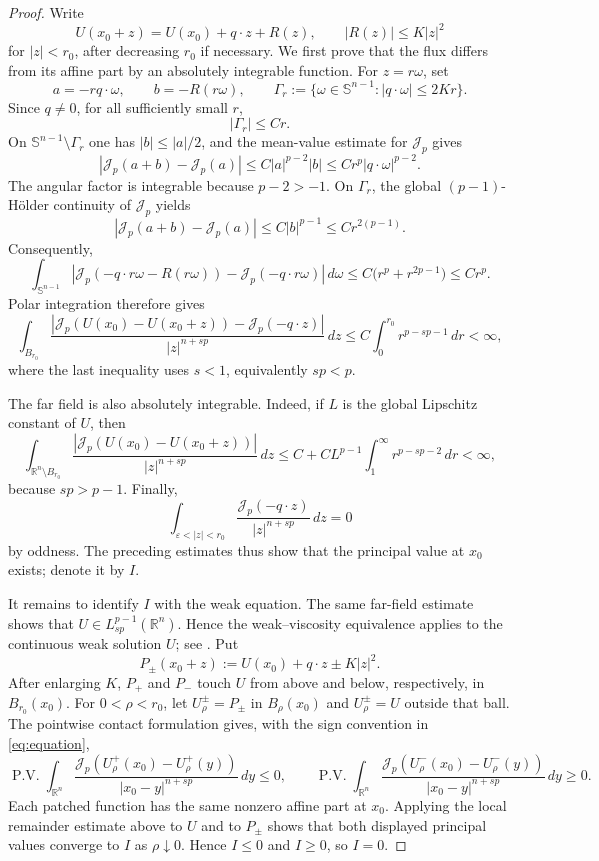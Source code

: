 \documentclass[11pt,reqno]{amsart}
\numberwithin{equation}{section}
\newcommand{\R}{\mathbb R}
\newcommand{\Jp}{\mathcal J_p}
\newcommand{\dd}{\,d}
\theoremstyle{remark}
\begin{document}
\begin{proof}
Write
\[
 U(x_0+z)=U(x_0)+q\cdot z+R(z),
 \qquad |R(z)|\le K|z|^2
\]
for \(|z|<r_0\), after decreasing \(r_0\) if necessary.  We first prove
that the flux differs from its affine part by an absolutely integrable
function.  For \(z=r\omega\), set
\[
 a=-r q\cdot\omega,\qquad b=-R(r\omega),\qquad
 \Gamma_r:=\{\omega\in\mathbb S^{n-1}:|q\cdot\omega|\le2Kr\}.
\]
Since \(q\ne0\), for all sufficiently small \(r\),
\[
 |\Gamma_r|\le C r.
\]
On \(\mathbb S^{n-1}\setminus\Gamma_r\) one has
\(|b|\le |a|/2\), and the mean-value estimate for \(\Jp\) gives
\[
 |\Jp(a+b)-\Jp(a)|
 \le C|a|^{p-2}|b|
 \le Cr^p|q\cdot\omega|^{p-2}.
\]
The angular factor is integrable because \(p-2>-1\).  On \(\Gamma_r\),
the global \((p-1)\)-H\"older continuity of \(\Jp\) yields
\[
 |\Jp(a+b)-\Jp(a)|
 \le C|b|^{p-1}\le Cr^{2(p-1)}.
\]
Consequently,
\[
 \int_{\mathbb S^{n-1}}
 |\Jp(-q\cdot r\omega-R(r\omega))
       -\Jp(-q\cdot r\omega)|\dd\omega
 \le C\bigl(r^p+r^{2p-1}\bigr)\le Cr^p.
\]
Polar integration therefore gives
\[
 \int_{B_{r_0}}
 \frac{|\Jp(U(x_0)-U(x_0+z))-\Jp(-q\cdot z)|}
 {|z|^{n+sp}}\dd z
 \le C\int_0^{r_0}r^{p-sp-1}\dd r<\infty,
\]
where the last inequality uses \(s<1\), equivalently \(sp<p\).

The far field is also absolutely integrable.  Indeed, if \(L\) is the
global Lipschitz constant of \(U\), then
\[
 \int_{\R^n\setminus B_{r_0}}
 \frac{|\Jp(U(x_0)-U(x_0+z))|}{|z|^{n+sp}}\dd z
 \le C+C L^{p-1}\int_1^\infty r^{p-sp-2}\dd r<\infty,
\]
because \(sp>p-1\).  Finally,
\[
 \int_{\varepsilon<|z|<r_0}
 \frac{\Jp(-q\cdot z)}{|z|^{n+sp}}\dd z=0
\]
by oddness.  The preceding estimates thus show that the principal value
at \(x_0\) exists; denote it by \(I\).

It remains to identify \(I\) with the weak equation.  The same far-field
estimate shows that \(U\in L^{p-1}_{sp}(\R^n)\).  Hence the
weak--viscosity equivalence applies to the continuous weak solution
\(U\); see \cite[Theorem~1.2]{KKL}.  Put
\[
 P_\pm(x_0+z):=U(x_0)+q\cdot z\pm K|z|^2.
\]
After enlarging \(K\), \(P_+\) and \(P_-\) touch \(U\) from above and
below, respectively, in \(B_{r_0}(x_0)\).  For
\(0<\rho<r_0\), let \(U^\pm_\rho=P_\pm\) in \(B_\rho(x_0)\) and
\(U^\pm_\rho=U\) outside that ball.  The pointwise contact formulation
\cite[Proposition~3.1]{KKL} gives, with the sign convention in
\eqref{eq:equation},
\[
 \operatorname{P.V.}\int_{\R^n}
 \frac{\Jp(U^+_\rho(x_0)-U^+_\rho(y))}
 {|x_0-y|^{n+sp}}\dd y\le0,
 \qquad
 \operatorname{P.V.}\int_{\R^n}
 \frac{\Jp(U^-_\rho(x_0)-U^-_\rho(y))}
 {|x_0-y|^{n+sp}}\dd y\ge0.
\]
Each patched function has the same nonzero affine part at \(x_0\).
Applying the local remainder estimate above to \(U\) and to
\(P_\pm\) shows that both displayed principal values converge to \(I\)
as \(\rho\downarrow0\).  Hence \(I\le0\) and \(I\ge0\), so \(I=0\).
\end{proof}
\end{document}
